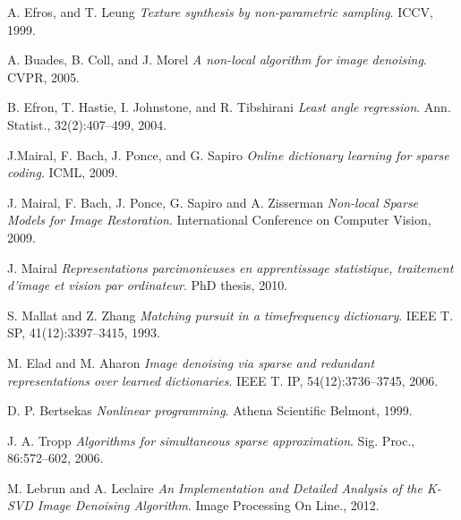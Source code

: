 \documentclass{ipol}
\begin{document}
\newpage

\begin{thebibliography}{9}

	A. Efros, and T. Leung
	\emph{Texture synthesis by non-parametric sampling}.
	ICCV,
	1999.

	A. Buades, B. Coll, and J. Morel
	\emph{A non-local algorithm for image denoising}.
	CVPR,
	2005.

	B. Efron, T. Hastie, I. Johnstone, and R. Tibshirani
	\emph{Least angle regression}. 
	Ann. Statist.,
	32(2):407–499,
	2004.

	J.Mairal, F. Bach, J. Ponce, and G. Sapiro
	\emph{Online dictionary learning for sparse coding}.
	ICML,
	2009.

	J. Mairal, F. Bach, J. Ponce, G. Sapiro and A. Zisserman
	\emph{ Non-local Sparse Models for Image Restoration}.
	International Conference on Computer Vision,
	2009.

	J. Mairal
	\emph{ Representations parcimonieuses en apprentissage statistique, traitement d’image et
vision par ordinateur}.
	PhD thesis,
	2010.

	S. Mallat and Z. Zhang
 	\emph{Matching pursuit in a timefrequency dictionary}.
	IEEE T. SP,
	41(12):3397–3415,
	1993.

	M. Elad and M. Aharon
	\emph{Image denoising via sparse and redundant representations over learned dictionaries}.
	IEEE T.
	IP, 54(12):3736–3745,
	2006.
	
	D. P. Bertsekas
	\emph{Nonlinear programming}.
	Athena Scientific Belmont,
	1999.
	
	J. A. Tropp
	\emph{Algorithms for simultaneous sparse approximation}.
	Sig. Proc.,
	86:572–602,
	2006.
	
	M. Lebrun and A. Leclaire
	\emph{{An Implementation and Detailed Analysis of the K-SVD Image Denoising Algorithm}}.
	{{Image Processing On Line}}.,
	2012.

\end{thebibliography}
\end{document}

